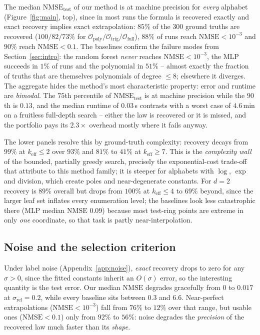 \documentclass{article}
\newcommand{\eff}{k_{\mathrm{eff}}}
\newcommand{\nmse}{\mathrm{NMSE}}
\begin{document}
The median $\nmse_{\mathrm{test}}$ of our method is at machine precision for
\emph{every} alphabet (Figure~\ref{fig:main}, top), since in most runs the
formula is recovered exactly and exact recovery implies exact extrapolation:
$85\%$ of the $300$ ground truths are recovered ($100/82/73\%$ for
$\mathcal{O}_{\mathrm{poly}}/\mathcal{O}_{\mathrm{trig}}/\mathcal{O}_{\mathrm{full}}$),
$88\%$ of runs reach $\nmse < 10^{-3}$ and $90\%$ reach $\nmse < 0.1$. The
baselines confirm the failure modes from Section~\ref{sec:intro}: the random
forest \emph{never} reaches $\nmse < 10^{-3}$, the MLP succeeds in $1\%$ of runs
and the polynomial in $51\%$ -- almost exactly the fraction of truths that are
themselves polynomials of degree $\le 8$; elsewhere it diverges. The aggregate hides the method's most characteristic property: error
and runtime are \emph{bimodal}. The $75$th percentile of $\nmse_{\mathrm{test}}$
is at machine precision while the $90$th is $0.13$, and the median runtime of
$0.03$\,s contrasts with a worst case of $4.6$\,min on a fruitless full-depth
search -- either the law is recovered or it is missed, and the portfolio pays
its $2.3\times$ overhead mostly where it fails anyway.

The lower panels resolve this by ground-truth complexity: recovery decays from
$99\%$ at $\eff \le 2$ over $93\%$ and $81\%$ to $41\%$ at $\eff \ge 7$. This is
the \emph{complexity wall} of the bounded, partially greedy search, precisely
the exponential-cost trade-off that \citet{DongZhongSurvey} attribute to this
method family; it is steeper for alphabets with $\log$, $\exp$ and division,
which create poles and near-degenerate constants. For $d{=}2$ recovery is $89\%$
overall but drops from $100\%$ at $\eff \le 4$ to $69\%$ beyond, since the
larger leaf set inflates every enumeration level; the baselines look less
catastrophic there (MLP median $\nmse$ $0.09$) because most test-ring points are
extreme in only \emph{one} coordinate, so that task is partly
near-interpolation.

\subsection{Noise and the selection criterion}
\label{sec:noise}

Under label noise (Appendix~\ref{app:noise}), \emph{exact} recovery drops to
zero for any $\sigma > 0$, since the fitted constants inherit an $O(\sigma)$
error, so the interesting quantity is the test error. Our median $\nmse$
degrades gracefully from $0$ to $0.017$ at $\sigma_{\mathrm{rel}} = 0.2$, while
every baseline sits between $0.3$ and $6.6$. Near-perfect extrapolations ($\nmse
< 10^{-3}$) fall from $76\%$ to $12\%$ over that range, but usable ones ($\nmse
< 0.1$) only from $92\%$ to $56\%$: noise degrades the \emph{precision} of the
recovered law much faster than its \emph{shape}.
\end{document}

